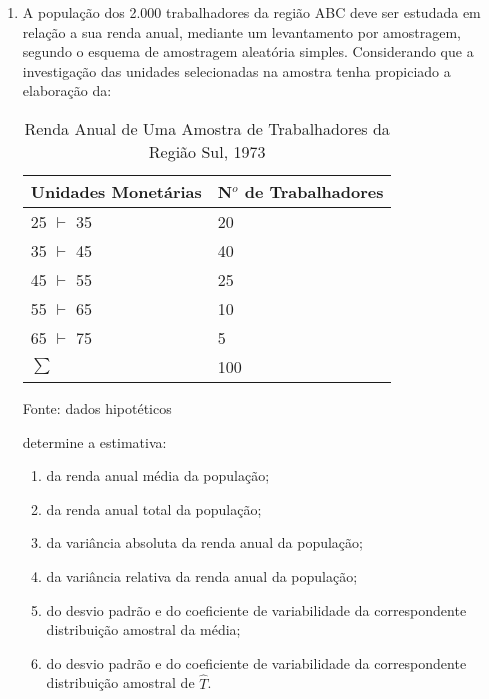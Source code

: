 \begin{enumerate}[resume]
\item A população dos 2.000 trabalhadores da região ABC deve ser estudada em relação a sua renda anual, mediante um levantamento por amostragem, segundo o esquema de amostragem aleatória simples. Considerando que a investigação das unidades selecionadas na amostra tenha propiciado a elaboração da:
	\begin{table}[!htb]
	\centering
	\caption{Renda Anual de Uma Amostra de Trabalhadores da Região Sul, 1973}
	\vspace{0.5cm}
	\begin{tabular}{ll}
	Unidades Monetárias & N$^o$ de Trabalhadores \\
	\hline 
	25 $\vdash$ 35 & 20 \\
	35 $\vdash$ 45 & 40 \\
	45 $\vdash$ 55 & 25 \\
	55 $\vdash$ 65 & 10 \\
	65 $\vdash$ 75 & 5 \\
	\hline
	$\sum$ & 100
	\end{tabular}
	 \newline \newline Fonte: dados hipotéticos
	\end{table}
	\newline determine a estimativa:
	\begin{enumerate}
	\item da renda anual média da população;
	\item da renda anual total da população;
	\item da variância absoluta da renda anual da população;
	\item da variância relativa da renda anual da população;
	\item do desvio padrão e do coeficiente de variabilidade da correspondente distribuição amostral da média;
	\item do desvio padrão e do coeficiente de variabilidade da correspondente distribuição amostral de $\hat{T}$.
	\end{enumerate}	
	

\end{enumerate}
